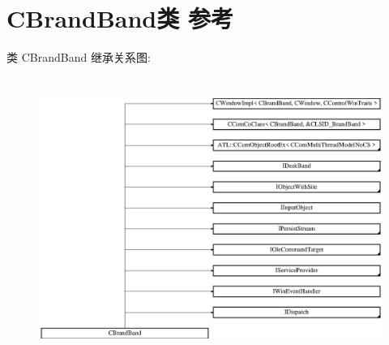 \hypertarget{class_c_brand_band}{}\section{C\+Brand\+Band类 参考}
\label{class_c_brand_band}
类 C\+Brand\+Band 继承关系图\+:\begin{figure}[H]
\begin{center}
\leavevmode
\includegraphics[height=9.230768cm]{class_c_brand_band}
\end{center}
\end{figure}
